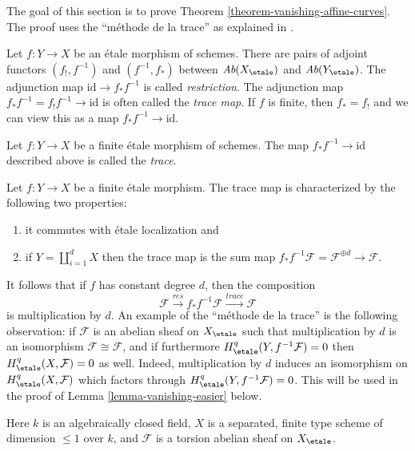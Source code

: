\noindent
The goal of this section is to prove
Theorem \ref{theorem-vanishing-affine-curves}.
The proof uses the ``m\'ethode de la trace''
as explained in \cite[Expos\'e IX, \S 5]{SGA4}.

\medskip\noindent
Let $f : Y \to X$ be an \'etale morphism of schemes. There are pairs of
adjoint functors $(f_!, f^{-1})$ and $(f^{-1}, f_*)$ between
$\textit{Ab}(X_\etale)$ and $\textit{Ab}(Y_\etale)$. The
adjunction map $\text{id} \to f_* f^{-1}$ is called {\it restriction}.
The adjunction map $f_* f^{-1} = f_! f^{-1} \to \text{id}$ is often
called the {\it trace map}. If $f$ is finite, then $f_* = f_!$ and
we can view this as a map $f_*f^{-1} \to \text{id}$.

\begin{definition}
\label{definition-trace-map}
Let $f : Y \to X$ be a finite \'etale morphism of schemes.
The map $f_* f^{-1} \to \text{id}$ described above is called the {\it trace}.
\end{definition}

\noindent
Let $f : Y \to X$ be a finite \'etale morphism. The trace map is
characterized by the following two properties:
\begin{enumerate}
\item it commutes with \'etale localization and
\item if $Y = \coprod_{i = 1}^d X$ then the trace map is
the sum map $f_*f^{-1} \mathcal{F} = \mathcal{F}^{\oplus d} \to \mathcal{F}$.
\end{enumerate}
It follows that if $f$ has constant degree $d$, then the composition
$$
\mathcal{F} \xrightarrow{res}
f_* f^{-1} \mathcal{F} \xrightarrow{trace}
\mathcal{F}
$$
is multiplication by $d$. An example of the ``m\'ethode de la trace''
is the following observation: if $\mathcal{F}$
is an abelian sheaf on $X_\etale$ such that multiplication by $d$ is an
isomorphism $\mathcal{F} \cong \mathcal{F}$, and if furthermore
$H_\etale^q(Y, f^{-1}\mathcal{F}) = 0$ then
$H_\etale^q(X, \mathcal{F}) = 0$ as well.
Indeed, multiplication by $d$ induces an
isomorphism on $H_\etale^q(X, \mathcal{F})$ which factors through
$H_\etale^q(Y, f^{-1}\mathcal{F})= 0$. This will be used in the proof
of Lemma \ref{lemma-vanishing-easier} below.

\begin{situation}
\label{situation-what-to-prove}
Here $k$ is an algebraically closed field, $X$ is a separated, finite type
scheme of dimension $\leq 1$ over $k$, and $\mathcal{F}$ is a torsion
abelian sheaf on $X_\etale$.
\end{situation}

